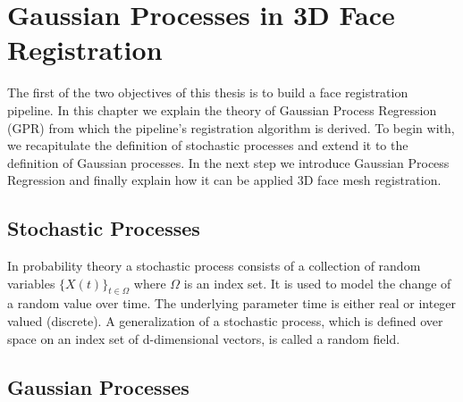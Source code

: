 \chapter{Gaussian Processes in 3D Face Registration}
\label{chap:GP}
The first of the two objectives of this thesis is to build a face registration pipeline. In this chapter we explain the theory of Gaussian Process Regression (GPR) from which the pipeline's registration algorithm is derived. To begin with, we recapitulate the definition
of stochastic processes and extend it to the definition of Gaussian processes. In the next step we introduce Gaussian Process Regression and finally explain how it can be applied 3D face mesh registration. 

\section{Stochastic Processes}

In probability theory a stochastic process consists of a collection of random variables $\{X(t)\}_{t \in \Omega}$ where $\Omega$ is an index set. It is used to model the change of a random value over time. The underlying parameter time is either real or integer valued (discrete). A generalization of a stochastic process, which is defined over space on an index set of d-dimensional vectors, is called a random field. 

\section{Gaussian Processes}

